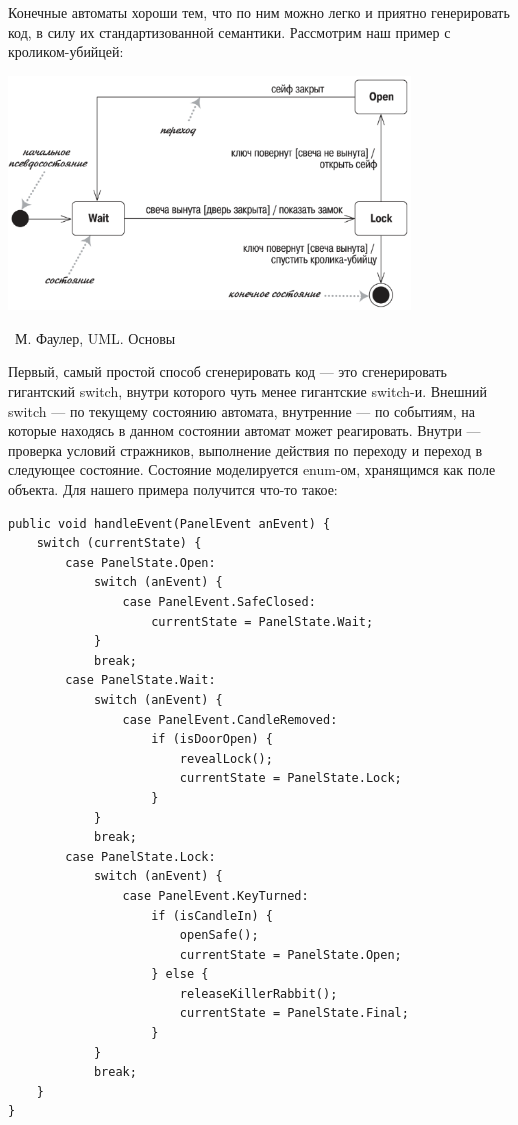\documentclass[a5paper]{article}
\newcommand{\attribution}[1] {
	\vspace{-5mm}\begin{flushright}\begin{scriptsize}%
	{\textcopyright\, #1}\end{scriptsize}\end{flushright}
}
\begin{document}
Конечные автоматы хороши тем, что по ним можно легко и приятно генерировать код, в силу их стандартизованной семантики. Рассмотрим наш пример с кроликом-убийцей:

\begin{center}
	\includegraphics[width=0.8\textwidth]{stateTransitionSyntax.png}
	\attribution{М. Фаулер, UML. Основы}
\end{center}

Первый, самый простой способ сгенерировать код --- это сгенерировать гигантский switch, внутри которого чуть менее гигантские switch-и. Внешний switch --- по текущему состоянию автомата, внутренние --- по событиям, на которые находясь в данном состоянии автомат может реагировать. Внутри --- проверка условий стражников, выполнение действия по переходу и переход в следующее состояние. Состояние моделируется enum-ом, хранящимся как поле объекта. Для нашего примера получится что-то такое:

\begin{verbatim}
public void handleEvent(PanelEvent anEvent) {
    switch (currentState) {
        case PanelState.Open:
            switch (anEvent) {
                case PanelEvent.SafeClosed:
                    currentState = PanelState.Wait;
            }
            break;
        case PanelState.Wait:
            switch (anEvent) {
                case PanelEvent.CandleRemoved:
                    if (isDoorOpen) {
                        revealLock();
                        currentState = PanelState.Lock;
                    }
            }
            break;
        case PanelState.Lock:
            switch (anEvent) {
                case PanelEvent.KeyTurned:
                    if (isCandleIn) {
                        openSafe();
                        currentState = PanelState.Open;
                    } else {
                        releaseKillerRabbit();
                        currentState = PanelState.Final;
                    }
            }
            break;
    }
}
\end{verbatim}
\end{document}
